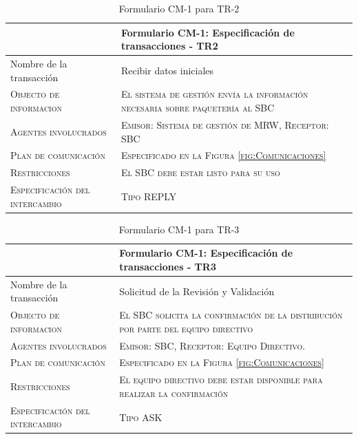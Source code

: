 \begin{table}[H]
  \scriptsize
  \begin{tabularx}{\textwidth}{|l|X|} \hline
    & \textbf{Formulario CM-1: Especificación de transacciones - TR2} \\
    \hline\hline
    {Nombre de la transacción} & Recibir datos iniciales\\
    \hline  
    \textsc{Objecto de informacion} & \textsc{El sistema de gestión envía la información necesaria sobre paquetería al SBC}\\ 
    \hline
    \textsc{Agentes involucrados} & \textsc{Emisor: Sistema de gestión de MRW, Receptor: SBC}\\ 
    \hline
    \textsc{Plan de comunicación} & \textsc{Especificado en la Figura \ref{fig:Comunicaciones} }\\ 
    \hline
    \textsc{Restricciones} & \textsc{El SBC debe estar listo para su uso}\\ 
    \hline
    \textsc{Especificación del intercambio} & \textsc{Tipo REPLY}\\ 
    \hline
  \end{tabularx}
  \caption{\label{tab:TR2}Formulario CM-1 para TR-2}
\end{table}


\begin{table}[H]
  \scriptsize
  \begin{tabularx}{\textwidth}{|l|X|} \hline
    & \textbf{Formulario CM-1: Especificación de transacciones - TR3} \\
    \hline\hline
    {Nombre de la transacción} & Solicitud de la Revisión y Validación\\
    \hline  
    \textsc{Objecto de informacion} & \textsc{El SBC solicita la confirmación de la distribución por parte del equipo directivo}\\ 
    \hline
    \textsc{Agentes involucrados} & \textsc{Emisor: SBC, Receptor: Equipo Directivo.}\\ 
    \hline
    \textsc{Plan de comunicación} & \textsc{Especificado en la Figura \ref{fig:Comunicaciones} }\\ 
    \hline
    \textsc{Restricciones} & \textsc{El equipo directivo debe estar disponible para realizar la confirmación}\\ 
    \hline
    \textsc{Especificación del intercambio} & \textsc{Tipo ASK}\\ 
    \hline
  \end{tabularx}
    \caption{\label{tab:TR3}Formulario CM-1 para TR-3}
\end{table}

